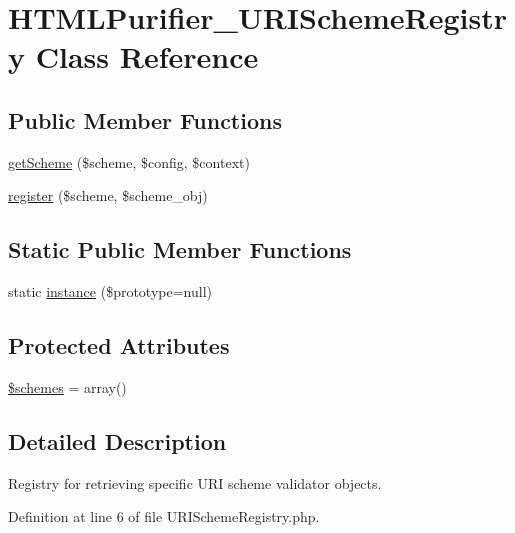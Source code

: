 \hypertarget{classHTMLPurifier__URISchemeRegistry}{\section{H\+T\+M\+L\+Purifier\+\_\+\+U\+R\+I\+Scheme\+Registry Class Reference}
\label{classHTMLPurifier__URISchemeRegistry}
}
\subsection*{Public Member Functions}
\begin{DoxyCompactItemize}
\item 
\hyperlink{classHTMLPurifier__URISchemeRegistry_a2b3f89809bc2543b488aa9d3cf2383fb}{get\+Scheme} (\$scheme, \$config, \$context)
\item 
\hyperlink{classHTMLPurifier__URISchemeRegistry_a7c47d1c1120c4ef8ca2e7a1dd306e756}{register} (\$scheme, \$scheme\+\_\+obj)
\end{DoxyCompactItemize}
\subsection*{Static Public Member Functions}
\begin{DoxyCompactItemize}
\item 
static \hyperlink{classHTMLPurifier__URISchemeRegistry_a2608e36f049cfdaa951984a4aab1f721}{instance} (\$prototype=null)
\end{DoxyCompactItemize}
\subsection*{Protected Attributes}
\begin{DoxyCompactItemize}
\item 
\hyperlink{classHTMLPurifier__URISchemeRegistry_a09ca1389f3c5d6912b41a9b55b249a40}{\$schemes} = array()
\end{DoxyCompactItemize}


\subsection{Detailed Description}
Registry for retrieving specific U\+R\+I scheme validator objects. 

Definition at line 6 of file U\+R\+I\+Scheme\+Registry.\+php.



